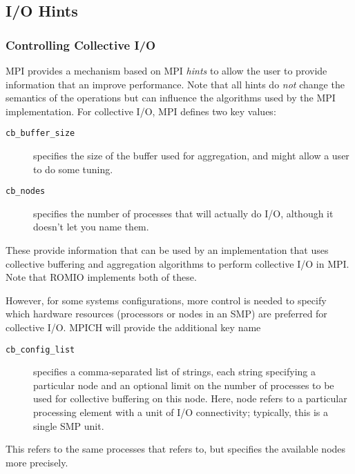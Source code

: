 \subsection{I/O Hints}

\subsubsection{Controlling Collective I/O}

MPI provides a mechanism based on MPI \emph{hints} to allow the user to
provide information that an improve performance.  Note that all hints do
\emph{not} change the semantics of the operations but can influence the
algorithms used by the MPI implementation.  For collective I/O, MPI defines
two  key values:
\begin{description}
\item[\texttt{cb_buffer_size}] specifies the size of the buffer used for
  aggregation, and might allow a user to do some tuning.
\item[\texttt{cb_nodes}]specifies the number of processes that will actually
  do I/O, although it doesn't let you name them.
\end{description}
These provide information that can be used by an implementation that uses
collective buffering and aggregation algorithms to perform collective I/O in
MPI.  Note that ROMIO implements both of these.


However, for some systems configurations, more control is needed to specify
which hardware resources (processors or nodes in an SMP) are preferred for
collective I/O.  MPICH will provide the additional  key name
\begin{description}
\item[\texttt{cb_config_list}]specifies a comma-separated list of strings,
  each string specifying a particular node and an optional limit on the number
  of processes to be used for collective buffering on this node.  Here, node
  refers to a particular processing element with a unit of I/O connectivity;
  typically, this is a single SMP unit.
\end{description}
This refers to the same processes that  refers to, but
specifies the available nodes more precisely.

